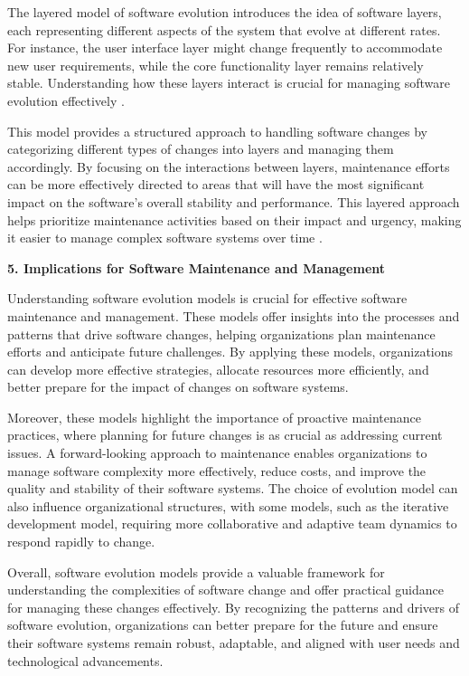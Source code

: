 \begin{refsection}
The layered model of software evolution introduces the idea of software layers, each representing different aspects of the system that evolve at different rates. For instance, the user interface layer might change frequently to accommodate new user requirements, while the core functionality layer remains relatively stable. Understanding how these layers interact is crucial for managing software evolution effectively \cite[pp.~113-115]{parnas1994software}.

This model provides a structured approach to handling software changes by categorizing different types of changes into layers and managing them accordingly. By focusing on the interactions between layers, maintenance efforts can be more effectively directed to areas that will have the most significant impact on the software's overall stability and performance. This layered approach helps prioritize maintenance activities based on their impact and urgency, making it easier to manage complex software systems over time \cite[pp.~115-116]{parnas1994software}.

\textbf{5. Implications for Software Maintenance and Management}

Understanding software evolution models is crucial for effective software maintenance and management. These models offer insights into the processes and patterns that drive software changes, helping organizations plan maintenance efforts and anticipate future challenges. By applying these models, organizations can develop more effective strategies, allocate resources more efficiently, and better prepare for the impact of changes on software systems.

Moreover, these models highlight the importance of proactive maintenance practices, where planning for future changes is as crucial as addressing current issues. A forward-looking approach to maintenance enables organizations to manage software complexity more effectively, reduce costs, and improve the quality and stability of their software systems. The choice of evolution model can also influence organizational structures, with some models, such as the iterative development model, requiring more collaborative and adaptive team dynamics to respond rapidly to change.

Overall, software evolution models provide a valuable framework for understanding the complexities of software change and offer practical guidance for managing these changes effectively. By recognizing the patterns and drivers of software evolution, organizations can better prepare for the future and ensure their software systems remain robust, adaptable, and aligned with user needs and technological advancements.


\end{refsection}
